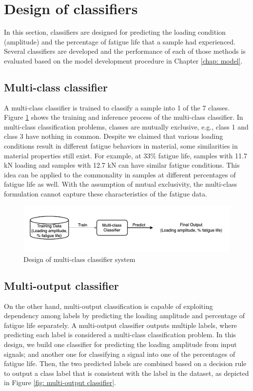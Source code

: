 \section{Design of classifiers}
\label{sec: design of classifiers}
In this section, classifiers are designed for predicting the loading condition (amplitude) and the percentage of fatigue life that a sample had experienced. Several classifiers are developed and the performance of each of those methods is evaluated based on the model development procedure in Chapter \ref{chap: model}.

\subsection{Multi-class classifier}
A multi-class classifier is trained to classify a sample into 1 of the 7 classes. Figure \ref{fig: multi-class classifier} shows the training and inference process of the multi-class classifier. In multi-class classification problems, classes are mutually exclusive, e.g., class 1 and class 3 have nothing in common. Despite we claimed that various loading conditions result in different fatigue behaviors in material, some similarities in material properties still exist. For example, at 33\% fatigue life, samples with 11.7 kN loading and samples with 12.7 kN can have similar fatigue conditions. This idea can be applied to the commonality in samples at different percentages of fatigue life as well. With the assumption of mutual exclusivity, the multi-class formulation cannot capture these characteristics of the fatigue data.

\begin{figure}[tb]
    \centering
    \includegraphics[width=0.9\linewidth]{fig/multi-class_classifier.png}
    \caption{Design of multi-class classifier system}
    \label{fig: multi-class classifier}
\end{figure}

\subsection{Multi-output classifier}
\label{subsec: multi-output classifier}
On the other hand, multi-output classification is capable of exploiting dependency among labels \cite{multi-label-Zhang2014} by predicting the loading amplitude and percentage of fatigue life separately. A multi-output classifier outputs multiple labels, where predicting each label is considered a multi-class classification problem. In this design, we build one classifier for predicting the loading amplitude from input signals; and another one for classifying a signal into one of the percentages of fatigue life. Then, the two predicted labels are combined based on a decision rule to output a class label that is consistent with the label in the dataset, as depicted in Figure \ref{fig: multi-output classifier}. 

